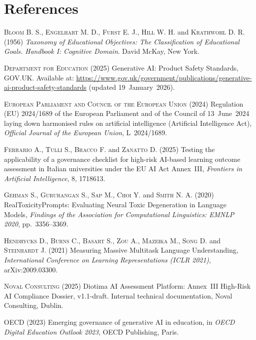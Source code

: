 \documentclass[10pt, a4paper, twocolumn]{article}
\begin{document}
\section*{References}

\begin{small}
\sloppy
\setlength{\parskip}{3pt}
\noindent
\textsc{Bloom B. S., Engelhart M. D., Furst E. J., Hill W. H.} and \textsc{Krathwohl D. R.}
(1956) \textit{Taxonomy of Educational Objectives: The Classification of Educational
Goals. Handbook I: Cognitive Domain}. David McKay, New York.

\medskip\noindent
\textsc{Department for Education} (2025) Generative AI: Product Safety Standards,
GOV.UK. Available at:
\url{https://www.gov.uk/government/publications/generative-ai-product-safety-standards}
(updated 19~January~2026).

\medskip\noindent
\textsc{European Parliament and Council of the European Union} (2024)
Regulation (EU) 2024/1689 of the European Parliament and of the Council of
13~June~2024 laying down harmonised rules on artificial intelligence (Artificial
Intelligence Act), \textit{Official Journal of the European Union}, L~2024/1689.

\medskip\noindent
\textsc{Ferrario A., Tulli S., Bracco F.} and \textsc{Zanatto D.} (2025)
Testing the applicability of a governance checklist for high-risk AI-based learning
outcome assessment in Italian universities under the EU AI Act Annex~III,
\textit{Frontiers in Artificial Intelligence}, 8, 1718613.

\medskip\noindent
\textsc{Gehman S., Gururangan S., Sap M., Choi Y.} and \textsc{Smith N. A.}
(2020) RealToxicityPrompts: Evaluating Neural Toxic Degeneration in Language
Models, \textit{Findings of the Association for Computational Linguistics:
EMNLP 2020}, pp.\ 3356--3369.

\medskip\noindent
\textsc{Hendrycks D., Burns C., Basart S., Zou A., Mazeika M., Song D.}
and \textsc{Steinhardt J.} (2021)
Measuring Massive Multitask Language Understanding,
\textit{International Conference on Learning Representations (ICLR 2021)},
arXiv:2009.03300.

\medskip\noindent
\textsc{Noval Consulting} (2025)
Diotima AI Assessment Platform: Annex~III High-Risk AI Compliance Dossier, v1.1-draft.
Internal technical documentation, Noval Consulting, Dublin.

\medskip\noindent
\textsc{OECD} (2023) Emerging governance of generative AI in education, in
\textit{OECD Digital Education Outlook 2023}, OECD Publishing, Paris.


\end{small}
\end{document}

